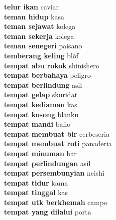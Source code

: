 \textbf{ telur ikan  } caviar \\
\textbf{ teman hidup  } kasa \\
\textbf{ teman sejawat  } kolega \\
\textbf{ teman sekerja  } kolega \\
\textbf{ teman senegeri  } paisano \\
\textbf{ temberang keling  } blòf \\
\textbf{ tempat abu rokok  } shinishero \\
\textbf{ tempat berbahaya  } peligro \\
\textbf{ tempat berlindung  } asil \\
\textbf{ tempat gelap  } skuridat \\
\textbf{ tempat kediaman  } kas \\
\textbf{ tempat kosong  } blanku \\
\textbf{ tempat mandi  } baño \\
\textbf{ tempat membuat bir  } cerbeseria \\
\textbf{ tempat membuat roti  } panaderia \\
\textbf{ tempat minuman  } bar \\
\textbf{ tempat perlindungan  } asil \\
\textbf{ tempat persembunyian  } neishi \\
\textbf{ tempat tidur  } kama \\
\textbf{ tempat tinggal  } kas \\
\textbf{ tempat utk berkhemah  } campo \\
\textbf{ tempat yang dilalui  } porta \\
